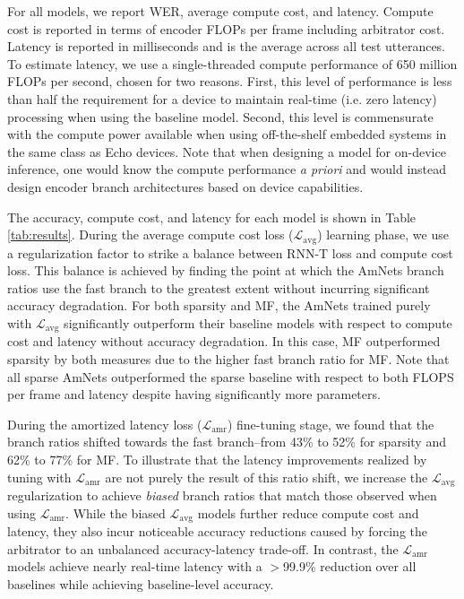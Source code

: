 \documentclass[a4paper]{article}
\begin{document}
For all models, we report WER, average compute cost, and latency. Compute cost is reported in terms of encoder FLOPs per frame including arbitrator cost. Latency is reported in milliseconds and is the average across all test utterances. To estimate latency, we use a single-threaded compute performance of 650 million FLOPs per second, chosen for two reasons. First, this level of performance is less than half the requirement for a device to maintain real-time (i.e. zero latency) processing when using the baseline model. Second, this level is commensurate with the compute power available when using off-the-shelf embedded systems in the same class as Echo devices.  Note that when designing a model for on-device inference, one would know the compute performance \emph{a priori} and would instead design encoder branch architectures based on device capabilities.

The accuracy, compute cost, and latency for each model is shown in Table \ref{tab:results}. During the average compute cost loss ($\mathcal{L}_{\text{avg}}$) learning phase, we use a regularization factor to strike a balance between RNN-T loss and compute cost loss. This balance is achieved by finding the point at which the AmNets branch ratios use the fast branch to the greatest extent without incurring significant accuracy degradation. For both sparsity and MF, the AmNets trained purely with $\mathcal{L}_{\text{avg}}$ significantly outperform their baseline models with respect to compute cost and latency without accuracy degradation. In this case, MF outperformed sparsity by both measures due to the higher fast branch ratio for MF. Note that all sparse AmNets outperformed the sparse baseline with respect to both FLOPS per frame and latency despite having significantly more parameters.

During the amortized latency loss ($\mathcal{L}_{\text{amr}}$) fine-tuning stage, we found that the branch ratios shifted towards the fast branch--from 43\% to 52\% for sparsity and 62\% to 77\% for MF. To illustrate that the latency improvements realized by tuning with $\mathcal{L}_{\text{amr}}$ are not purely the result of this ratio shift, we increase the $\mathcal{L}_{\text{avg}}$ regularization to achieve \emph{biased} branch ratios that match those observed when using $\mathcal{L}_{\text{amr}}$. While the biased $\mathcal{L}_{\text{avg}}$ models further reduce compute cost and latency, they also incur noticeable accuracy reductions caused by forcing the arbitrator to an unbalanced accuracy-latency trade-off. In contrast, the $\mathcal{L}_{\text{amr}}$ models achieve nearly real-time latency with a $>$99.9\% reduction over all baselines while achieving baseline-level accuracy.
\end{document}

